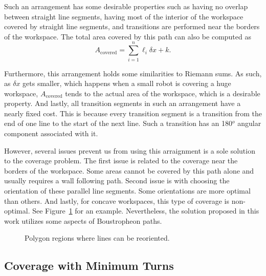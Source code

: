\documentclass[../main.tex]{subfiles}
\begin{document}
Such an arrangement has some desirable properties such as having no overlap between straight line segments, having most of the interior of the workspace covered by straight line segments, and transitions are performed near the borders of the workspace. The total area covered by this path can also be computed as
\begin{equation}
	A_{\text{covered}}=\sum_{i=1}^n\ell_i\delta x + k.
\end{equation}

Furthermore, this arrangement holds some similarities to Riemann sums. As such, as $\delta x$ gets smaller, which happens when a small robot is covering a huge workspace, $A_{\text{covered}}$ tends to the actual area of the workspace, which is a desirable property. And lastly, all transition segments in such an arrangement have a nearly fixed cost. This is because every transition segment is a transition from the end of one line to the start of the next line. Such a transition has an 180$^o$ angular component associated with it.

However, several issues prevent us from using this arraignment is a sole solution to the coverage problem. The first issue is related to the coverage near the borders of the workspace. Some areas cannot be covered by this path alone and usually requires a wall following path. Second issue is with choosing the orientation of these parallel line segments. Some orientations are more optimal than others. And lastly, for concave workspaces, this type of coverage is non-optimal. See Figure~\ref{fig:reorder_regions} for an example. Nevertheless, the solution proposed in this work utilizes some aspects of Boustropheon paths.

\begin{figure}
	\centering
	\begin{subfigure}{0.5\linewidth}
		\centering
		
	\end{subfigure}%
	\begin{subfigure}{0.5\linewidth}
		\centering
		
	\end{subfigure}
	\caption{Polygon regions where lines can be reoriented.}
	\label{fig:reorder_regions}
\end{figure}


\subsection{Coverage with Minimum Turns}
\label{subsection:coverage_with_minimum_turns}
\end{document}

